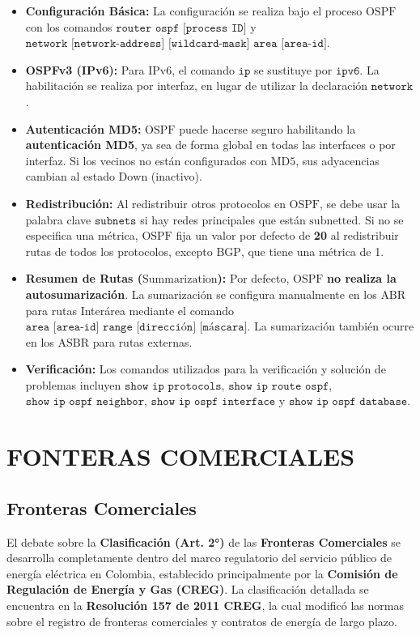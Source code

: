 \documentclass[a5paper]{book}%
\begin{document}
  \begin{itemize}
  	\item \textbf{Configuración Básica:} La configuración se realiza bajo el proceso $\text{OSPF}$ con los comandos $\texttt{router ospf [process ID]}$ y $\texttt{network [network-address] [wildcard-mask] area [area-id]}$.
  	\item \textbf{OSPFv3 (IPv6):} Para $\text{IPv6}$, el comando $\texttt{ip}$ se sustituye por $\texttt{ipv6}$. La habilitación se realiza por interfaz, en lugar de utilizar la declaración $\texttt{network}$.
  	\item \textbf{Autenticación MD5:} $\text{OSPF}$ puede hacerse seguro habilitando la \textbf{autenticación MD5}, ya sea de forma global en todas las interfaces o por interfaz. Si los vecinos no están configurados con $\text{MD5}$, sus adyacencias cambian al estado $\text{Down}$ (inactivo).
  	\item \textbf{Redistribución:} Al redistribuir otros protocolos en $\text{OSPF}$, se debe usar la palabra clave $\texttt{subnets}$ si hay redes principales que están $\text{subnetted}$. Si no se especifica una métrica, $\text{OSPF}$ fija un valor por defecto de \textbf{20} al redistribuir rutas de todos los protocolos, excepto $\text{BGP}$, que tiene una métrica de 1.
  	\item \textbf{Resumen de Rutas ($\text{Summarization}$):} Por defecto, $\text{OSPF}$ \textbf{no realiza la autosumarización}. La sumarización se configura manualmente en los $\text{ABR}$ para rutas Interárea mediante el comando $\texttt{area [area-id] range [dirección] [máscara]}$. La sumarización también ocurre en los $\text{ASBR}$ para rutas externas.
  	\item \textbf{Verificación:} Los comandos utilizados para la verificación y solución de problemas incluyen $\texttt{show ip protocols}$, $\texttt{show ip route ospf}$, $\texttt{show ip ospf neighbor}$, $\texttt{show ip ospf interface}$ y $\texttt{show ip ospf database}$.
  \end{itemize}
  
  
\chapter{FONTERAS COMERCIALES}  

\section{Fronteras Comerciales}

El debate sobre la \textbf{Clasificación (Art. 2°)} de las \textbf{Fronteras Comerciales} se desarrolla completamente dentro del marco regulatorio del servicio público de energía eléctrica en Colombia, establecido principalmente por la \textbf{Comisión de Regulación de Energía y Gas (CREG)}. La clasificación detallada se encuentra en la \textbf{Resolución 157 de 2011 CREG}, la cual modificó las normas sobre el registro de fronteras comerciales y contratos de energía de largo plazo.
\end{document}
